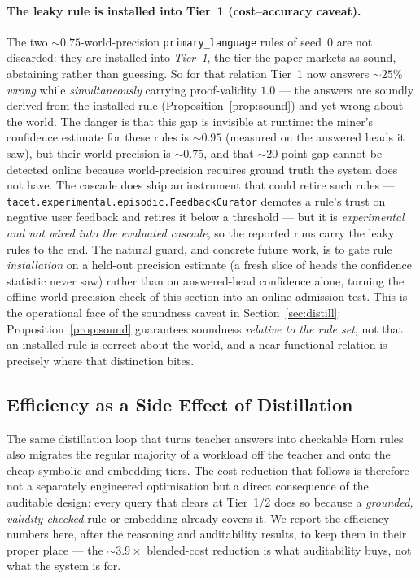 \documentclass[11pt]{article}
\theoremstyle{plain}
\newcommand{\costFactor}{3.9}
\begin{document}
\paragraph{The leaky rule is installed into Tier~1 (cost--accuracy caveat).}
The two $\sim\!0.75$-world-precision \texttt{primary\_language} rules of seed~$0$
are not discarded: they are installed into \emph{Tier~1}, the tier the paper
markets as sound, abstaining rather than guessing. So for that relation Tier~1
now answers ${\sim}25\%$ \emph{wrong} while \emph{simultaneously} carrying
proof-validity $1.0$ --- the answers are soundly derived from the installed rule
(Proposition~\ref{prop:sound}) and yet wrong about the world. The danger is that
this gap is invisible at runtime: the miner's confidence estimate for these rules
is ${\sim}0.95$ (measured on the answered heads it saw), but their world-precision
is ${\sim}0.75$, and that ${\sim}20$-point gap cannot be detected online because
world-precision requires ground truth the system does not have. The cascade does
ship an instrument that could retire such rules ---
\texttt{tacet.experimental.episodic.FeedbackCurator} demotes a rule's trust on
negative user feedback and retires it below a threshold --- but it is
\emph{experimental and not wired into the evaluated cascade}, so the reported runs
carry the leaky rules to the end. The natural guard, and concrete future work, is
to gate rule \emph{installation} on a held-out precision estimate (a fresh slice
of heads the confidence statistic never saw) rather than on answered-head
confidence alone, turning the offline world-precision check of this section into
an online admission test. This is the operational face of the soundness caveat in
Section~\ref{sec:distill}: Proposition~\ref{prop:sound} guarantees soundness
\emph{relative to the rule set}, not that an installed rule is correct about the
world, and a near-functional relation is precisely where that distinction bites.

\subsection{Efficiency as a Side Effect of Distillation}
\label{sec:efficiency}

The same distillation loop that turns teacher answers into checkable Horn
rules also migrates the regular majority of a workload off the teacher and
onto the cheap symbolic and embedding tiers. The cost reduction that follows
is therefore not a separately engineered optimisation but a direct
consequence of the auditable design: every query that clears at Tier~1/2
does so because a \emph{grounded, validity-checked} rule or embedding already
covers it. We report the efficiency numbers here, after the reasoning and
auditability results, to keep them in their proper place --- the
${\sim}\costFactor\times$ blended-cost reduction is what auditability buys,
not what the system is for.
\end{document}
